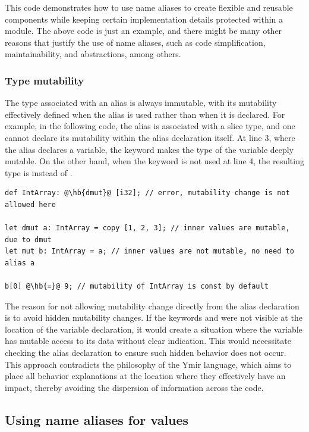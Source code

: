 This code demonstrates how to use name aliases to create flexible and reusable
components while keeping certain implementation details protected within a
module. The above code is just an example, and there might be many other reasons
that justify the use of name aliases, such as code simplification,
maintainability, and abstractions, among others.

\subsubsection*{Type mutability}

The type associated with an alias is always immutable, with its mutability
effectively defined when the alias is used rather than when it is declared. For
example, in the following code, the alias  is associated with a
\token{[i32]} slice type, and one cannot declare its mutability within the alias
declaration itself. At line 3, where the alias  declares a
variable, the keyword  makes the type of the
variable deeply mutable. On the other hand, when the keyword  is not
used at line 4, the resulting type is  instead of .

\begin{lstlisting}[style=coloredverbatimError, escapechar=@]
def IntArray: @\hb{dmut}@ [i32]; // error, mutability change is not allowed here

let dmut a: IntArray = copy [1, 2, 3]; // inner values are mutable, due to dmut
let mut b: IntArray = a; // inner values are not mutable, no need to alias a

b[0] @\hb{=}@ 9; // mutability of IntArray is const by default
\end{lstlisting}

The reason for not allowing mutability change directly from the alias
declaration is to avoid hidden mutability changes. If the keywords 
and  were not visible at the location of the variable declaration,
it would create a situation where the variable has mutable access to its data
without clear indication. This would necessitate checking the alias declaration
to ensure such hidden behavior does not occur. This approach contradicts the
philosophy of the Ymir language, which aims to place all behavior explanations
at the location where they effectively have an impact, thereby avoiding the
dispersion of information across the code.

\subsection{Using name aliases for values}

